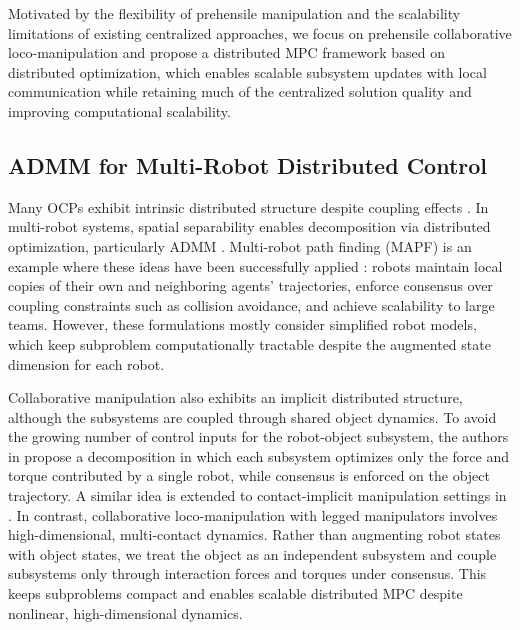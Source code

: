 Motivated by the flexibility of prehensile manipulation and the scalability limitations of existing centralized approaches, we focus on prehensile collaborative loco-manipulation and propose a distributed MPC framework based on distributed optimization, which enables scalable subsystem updates with local communication while retaining much of the centralized solution quality and improving computational scalability.


\subsection{ADMM for Multi-Robot Distributed Control}
Many OCPs exhibit intrinsic distributed structure despite coupling effects \cite{zhao2024survey}. In multi-robot systems, spatial separability enables decomposition via distributed optimization, particularly ADMM \cite{boyd2011distributed}. Multi-robot path finding (MAPF) is an example where these ideas have been successfully applied \cite{saravanos2023distributed,tajbakhsh2025asynchronous}: robots maintain local copies of their own and neighboring agents' trajectories, enforce consensus over coupling constraints such as collision avoidance, and achieve scalability to large teams. However, these formulations mostly consider simplified robot models, which keep subproblem computationally tractable despite the augmented state dimension for each robot.

Collaborative manipulation also exhibits an implicit distributed structure, although the subsystems are coupled through shared object dynamics. 
To avoid the growing number of control inputs for the robot-object subsystem, the authors in \cite{shorinwa2020scalable} propose a decomposition in which each subsystem optimizes only the force and torque contributed by a single robot, while consensus is enforced on the object trajectory. A similar idea is extended to contact-implicit manipulation settings in \cite{shorinwa_disco_2024}. 
In contrast, collaborative loco-manipulation with legged manipulators involves high-dimensional, multi-contact dynamics. Rather than augmenting robot states with object states, we treat the object as an independent subsystem and couple subsystems only through interaction forces and torques under consensus. This keeps subproblems compact and enables scalable distributed MPC despite nonlinear, high-dimensional dynamics.
